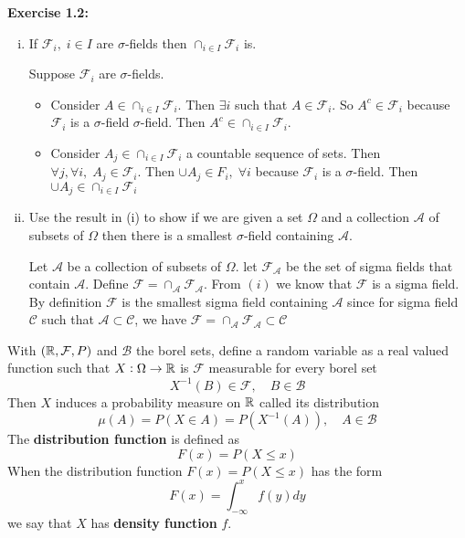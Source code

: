 \pagebreak
\textbf{Exercise 1.2:} 
\begin{enumerate}[i)]
    \item If $\mathcal{F}_i, \; i\in I$ are $\sigma$-fields then $\cap_{i \in I}\mathcal{F}_i$ is.
    \begin{mdframed}
        Suppose $\mathcal{F}_i$ are $\sigma$-fields. 
        \begin{itemize}
            \item Consider $A \in \cap_{i \in I}\mathcal{F}_i$. Then $\exists i$ such that $A \in \mathcal{F}_i$. So $A^c \in \mathcal{F}_i$ because $\mathcal{F}_i$ is a $\sigma$-field $\sigma$-field. Then $A^c \in \cap_{i \in I}\mathcal{F}_i$. 
            \item Consider $A_j \in \cap_{i \in I}\mathcal{F}_i$ a countable sequence of sets. Then $\forall j, \forall i, \; A_j \in \mathcal{F}_i$. Then $\cup A_j \in F_i, \; \forall i$ because $\mathcal{F}_i$ is a $\sigma$-field. Then $\cup A_j \in \cap_{i \in I}\mathcal{F}_i$ 
        \end{itemize}
        \end{mdframed}
    \item Use the result in (i) to show if we are given a set $\Omega$ and a collection $\mathcal{A}$ of subsets of $\Omega$ then there is a smallest $\sigma$-field containing $\mathcal{A}$.
    \begin{mdframed}
        Let $\mathcal{A}$ be a collection of subsets of $\Omega$. let $\mathcal{F}_\mathcal{A}$ be the set of sigma fields that contain $\mathcal{A}$. Define $\mathcal{F} = \cap_{\mathcal{A}}\mathcal{F}_\mathcal{A}$. From $(i)$ we know that $\mathcal{F}$ is a sigma field. By definition $\mathcal{F}$ is the smallest sigma field containing $\mathcal{A}$ since for sigma field $\mathcal{C}$ such that $\mathcal{A} \subset \mathcal{C}$, we have $\mathcal{F}=\cap_{\mathcal{A}}\mathcal{F}_\mathcal{A} \subset \mathcal{C}$
    \end{mdframed}
\end{enumerate}

\noindent With $(\mathbb{R}, \mathcal{F}, P)$ and $\mathcal{B}$ the borel sets, define a random variable as a real valued function such that $X: \Omega \to \mathbb{R}$ is $\mathcal{F}$ measurable for every borel set \[X^{-1}(B)\in \mathcal{F}, \quad B \in \mathcal{B}\]
Then $X$ induces a probability measure on $\mathbb{R}$ called its distribution \[\mu(A) = P(X \in A) = P(X^{-1}(A)), \quad A \in \mathcal{B}\]
The \textbf{distribution function} is defined as \[F(x) = P(X \leq x)\]
When the distribution function $F(x) = P(X \leq x)$ has the form \[F(x) = \int_{-\infty}^x f(y)dy\] we say that $X$ has \textbf{density function} $f$.

